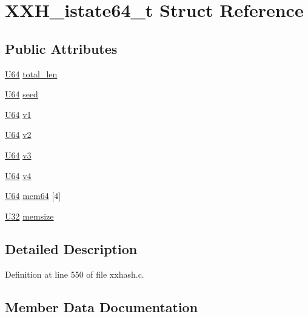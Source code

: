 \hypertarget{struct_x_x_h__istate64__t}{}\section{X\+X\+H\+\_\+istate64\+\_\+t Struct Reference}
\label{struct_x_x_h__istate64__t}
\subsection*{Public Attributes}
\begin{DoxyCompactItemize}
\item 
\hyperlink{xxhash_8c_a24c386d3758eba951eb7532fdbb45804}{U64} \hyperlink{struct_x_x_h__istate64__t_af12b1222f841660bef64efaae2a6a5a6}{total\+\_\+len}
\item 
\hyperlink{xxhash_8c_a24c386d3758eba951eb7532fdbb45804}{U64} \hyperlink{struct_x_x_h__istate64__t_a78dc60197be1a16bf99a15a85ce6e34c}{seed}
\item 
\hyperlink{xxhash_8c_a24c386d3758eba951eb7532fdbb45804}{U64} \hyperlink{struct_x_x_h__istate64__t_a5bdd6967a8d80194d4e55b2f61431b8f}{v1}
\item 
\hyperlink{xxhash_8c_a24c386d3758eba951eb7532fdbb45804}{U64} \hyperlink{struct_x_x_h__istate64__t_a8e14247869d90a1eea79cd99c0b06029}{v2}
\item 
\hyperlink{xxhash_8c_a24c386d3758eba951eb7532fdbb45804}{U64} \hyperlink{struct_x_x_h__istate64__t_a714d26f89359d5b897e3e8ffa97b946d}{v3}
\item 
\hyperlink{xxhash_8c_a24c386d3758eba951eb7532fdbb45804}{U64} \hyperlink{struct_x_x_h__istate64__t_aeb3e5e9f7d5ce61021dca87fae23df27}{v4}
\item 
\hyperlink{xxhash_8c_a24c386d3758eba951eb7532fdbb45804}{U64} \hyperlink{struct_x_x_h__istate64__t_afb9b66e9fbc5d3f51ffd0eafb869f544}{mem64} \mbox{[}4\mbox{]}
\item 
\hyperlink{xxhash_8c_ac3df7cf3c8cb172a588adec881447d68}{U32} \hyperlink{struct_x_x_h__istate64__t_af785fbcec8f01e664482baea8f0be464}{memsize}
\end{DoxyCompactItemize}


\subsection{Detailed Description}


Definition at line 550 of file xxhash.\+c.



\subsection{Member Data Documentation}
\hypertarget{struct_x_x_h__istate64__t_afb9b66e9fbc5d3f51ffd0eafb869f544}{}
